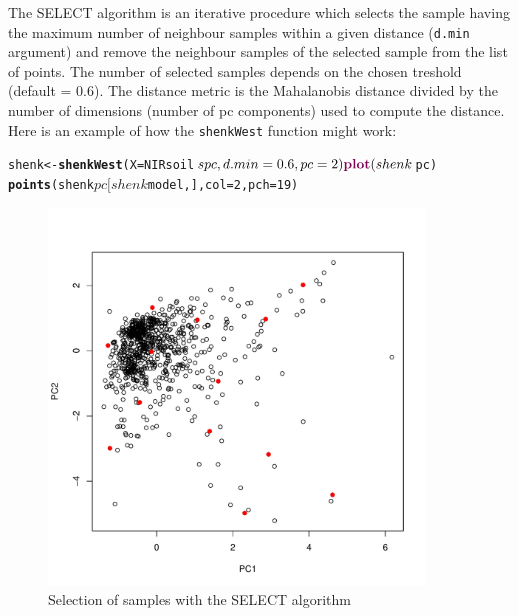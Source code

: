 \documentclass[12pt]{article}\usepackage{graphicx, color}
\makeatletter
\newcommand{\hlfunctioncall}[1]{\textcolor[rgb]{0.501960784313725,0,0.329411764705882}{\textbf{#1}}}%
\newenvironment{kframe}{%
 \def\at@end@of@kframe{}%
 \ifinner\ifhmode%
  \def\at@end@of@kframe{\end{minipage}}%
  \begin{minipage}{\columnwidth}%
 \fi\fi%
 \def\FrameCommand##1{\hskip\@totalleftmargin \hskip-\fboxsep
 \colorbox{shadecolor}{##1}\hskip-\fboxsep
     \hskip-\linewidth \hskip-\@totalleftmargin \hskip\columnwidth}%
 \MakeFramed {\advance\hsize-\width
   \@totalleftmargin\z@ \linewidth\hsize
   \@setminipage}}%
 {\par\unskip\endMakeFramed%
 \at@end@of@kframe}
\newenvironment{knitrout}{}{} %
\newcommand{\Rfunction}[1]{{\texttt{#1}}}
\newcommand{\Rargument}[1]{{\texttt{#1}}}
\makeatother
\begin{document}
The SELECT algorithm \cite{shenk1991} is an iterative procedure which selects the sample having the maximum number of neighbour samples within a given distance (\Rargument{d.min} argument) and remove the neighbour samples of the selected sample from the list of points. The number of selected samples depends on the chosen treshold (default = 0.6). The distance metric is the Mahalanobis distance divided by the number of dimensions (number of pc components) used to compute the distance. Here is an example of how the \Rfunction{shenkWest} function might work:

\begin{knitrout}
\color{fgcolor}\begin{kframe}
\begin{alltt}
shenk <- \hlfunctioncall{shenkWest}(X = NIRsoil$spc, d.min = 0.6, pc = 2)
\hlfunctioncall{plot}(shenk$pc)
\hlfunctioncall{points}(shenk$pc[shenk$model, ], col = 2, pch = 19)
\end{alltt}
\end{kframe}\begin{figure}[]


{\centering \includegraphics[width=10cm,height=10cm]{figure/shenk} 

}

\caption[Selection of samples with the SELECT algorithm]{Selection of samples with the SELECT algorithm\label{fig:shenk}}
\end{figure}


\end{knitrout}
\end{document}
